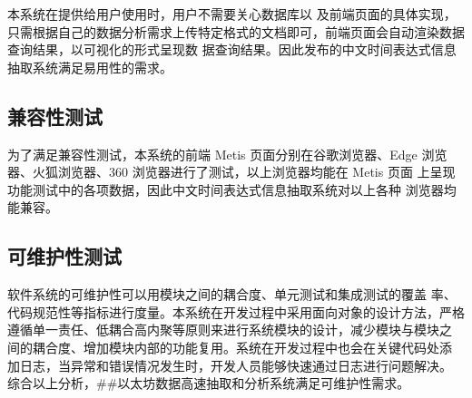 本系统在提供给用户使用时，用户不需要关心数据库以
及前端页面的具体实现，只需根据自己的数据分析需求上传特定格式的文档即可，前端页面会自动渲染数据查询结果，以可视化的形式呈现数
据查询结果。因此发布的中文时间表达式信息抽取系统满足易用性的需求。

\subsection{兼容性测试}

为了满足兼容性测试，本系统的前端 Metis 页面分别在谷歌浏览器、Edge
浏览器、火狐浏览器、360 浏览器进行了测试，以上浏览器均能在 Metis 页面
上呈现功能测试中的各项数据，因此中文时间表达式信息抽取系统对以上各种
浏览器均能兼容。

\subsection{可维护性测试}

软件系统的可维护性可以用模块之间的耦合度、单元测试和集成测试的覆盖
率、代码规范性等指标进行度量。本系统在开发过程中采用面向对象的设计方法，严格
遵循单一责任、低耦合高内聚等原则来进行系统模块的设计，减少模块与模块之
间的耦合度、增加模块内部的功能复用。系统在开发过程中也会在关键代码处添
加日志，当异常和错误情况发生时，开发人员能够快速通过日志进行问题解决。
综合以上分析，##以太坊数据高速抽取和分析系统满足可维护性需求。

